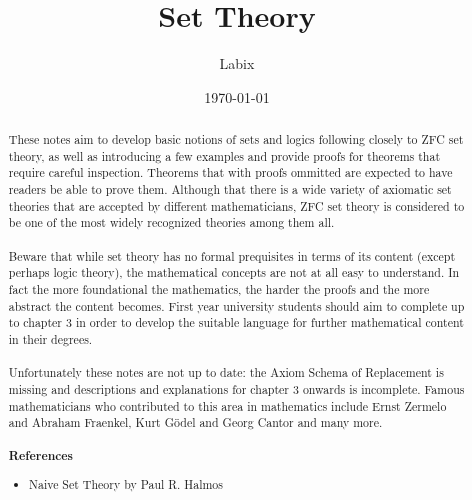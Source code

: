\documentclass[a4paper]{article}
\title{Set Theory}
\author{Labix}
\date{\today}
\begin{document}
\maketitle
\begin{abstract}
These notes aim to develop basic notions of sets and logics following closely to ZFC set theory, as well as introducing a few examples and provide proofs for theorems that require careful inspection. Theorems that with proofs ommitted are expected to have readers be able to prove them. Although that there is a wide variety of axiomatic set theories that are accepted by different mathematicians, ZFC set theory is considered to be one of the most widely recognized theories among them all. \\~\\
Beware that while set theory has no formal prequisites in terms of its content (except perhaps logic theory), the mathematical concepts are not at all easy to understand. In fact the more foundational the mathematics, the harder the proofs and the more abstract the content becomes. First year university students should aim to complete up to chapter $3$ in order to develop the suitable language for further mathematical content in their degrees. \\~\\
Unfortunately these notes are not up to date: the Axiom Schema of Replacement is missing and descriptions and explanations for chapter 3 onwards is incomplete. 
Famous mathematicians who contributed to this area in mathematics include Ernst Zermelo and Abraham Fraenkel, Kurt Gödel and Georg Cantor and many more. \\~\\
\textbf{References}
\begin{itemize}
\item Naive Set Theory by Paul R. Halmos
\end{itemize}
\end{abstract}
\pagebreak
\tableofcontents
\pagebreak

\end{document}
